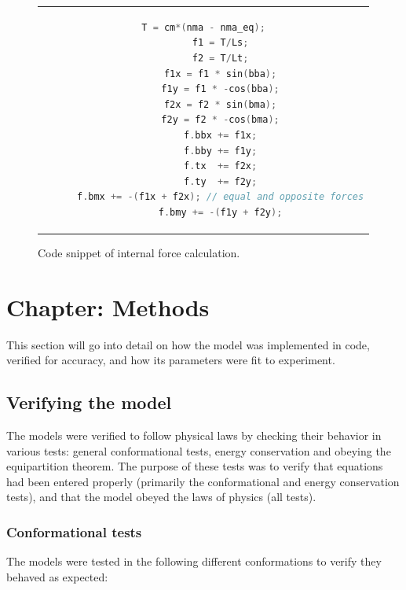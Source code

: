 \documentclass[10pt]{article} %
\begin{document}
\begin{figure}[h]
  \centering
  \begin{tabular}{c}
    \begin{lstlisting}[language=C++]
      T = cm*(nma - nma_eq);
      f1 = T/Ls;
      f2 = T/Lt;
      f1x = f1 * sin(bba);
      f1y = f1 * -cos(bba);
      f2x = f2 * sin(bma);
      f2y = f2 * -cos(bma);
      f.bbx += f1x;
      f.bby += f1y;
      f.tx  += f2x;
      f.ty  += f2y;
      f.bmx += -(f1x + f2x); // equal and opposite forces
      f.bmy += -(f1y + f2y);
    \end{lstlisting}
  \end{tabular}
  \caption{Code snippet of internal force calculation.}
  \label{transition-rate-snippet}
\end{figure}

\section{Chapter: Methods}
This section will go into detail on how the model was implemented in code, verified for accuracy, and how its parameters were fit to experiment.\\

\subsection{Verifying the model}
The models were verified to follow physical laws by checking their behavior in various tests: general conformational tests, energy conservation and obeying the equipartition theorem. The purpose of these tests was to verify that equations had been entered properly (primarily the conformational and energy conservation tests), and that the model obeyed the laws of physics (all tests).


\subsubsection{Conformational tests}
The models were tested in the following different conformations to verify they behaved as expected:\\
\end{document}

